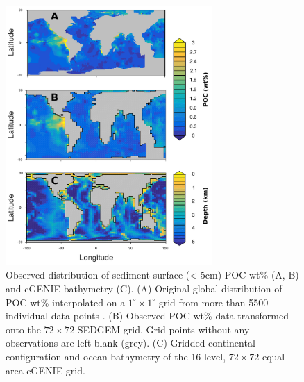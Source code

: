 \documentclass[gmd, manuscript]{copernicus}
\begin{document}
\begin{figure}[tbp]
\begin{center}
	\includegraphics[width=0.7\textwidth]{figures/OMEN-GENIE-Exp/Seiter_interpol_TOCwtpc_compare_until3+GENIEgrid.pdf}
	\caption{Observed distribution of sediment surface (< 5cm) POC wt\% (A, B) and cGENIE bathymetry (C). 
	(A) Original global distribution of POC wt\% interpolated on a $1^\circ \times 1^\circ$ grid from more than 5500 individual data points 
	\citep[compare][for the interpolation procedure]{seiter_organic_2004}. 
	(B) Observed POC wt\% data transformed onto the $72\times 72$ SEDGEM grid. Grid points without any observations are left blank (grey). 
	(C) Gridded continental configuration and ocean bathymetry of the 16-level, $72\times 72$ equal-area cGENIE grid.
	}\label{fig:TOC_Obs_regridded}
\end{center}
\end{figure}

\end{document}
